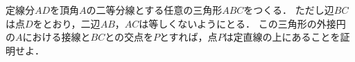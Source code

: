 \documentclass[../../main.tex]{subfiles}
\begin{document}
定線分$AD$を頂角$A$の二等分線とする任意の三角形$ABC$をつくる．
ただし辺$BC$は点$D$をとおり，二辺$AB$，$AC$は等しくないようにとる．
この三角形の外接円の$A$における接線と$BC$との交点を$P$とすれば，点$P$は定直線の上にあることを証明せよ．
\end{document}
